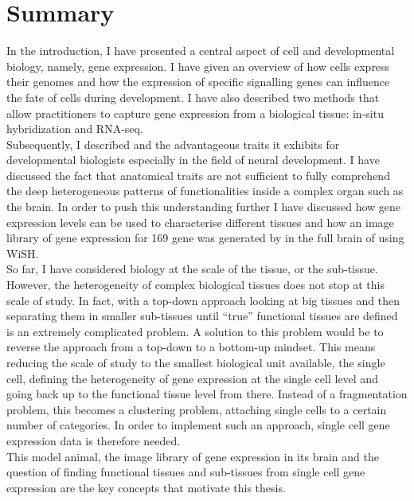     
\section{Summary}
     
     

	In the introduction, I have presented a central aspect of cell and developmental biology, namely, gene expression. I have given an overview of how cells express their genomes and how the expression of specific signalling genes can influence the fate of cells during development. I have also described two methods that allow practitioners to capture gene expression from a biological tissue: in-situ hybridization and RNA-seq.\\
	
	Subsequently, I described \platyfull{} and the advantageous traits it exhibits for developmental biologists especially in the field of neural development. I have discussed the fact that anatomical traits are not sufficient to fully comprehend the deep heterogeneous patterns of functionalities inside a complex organ such as the brain. In order to push this understanding further I have discussed how gene expression levels can be used to characterise different tissues and how an image library of gene expression for 169 gene was generated by \citep{Tomer10} in the full brain of \platy{} using WiSH.\\
	
	So far, I have considered biology at the scale of the tissue, or the sub-tissue. However, the heterogeneity of complex biological tissues does not stop at this scale of study. In fact, with a top-down approach looking at big tissues and then separating them in smaller sub-tissues until ``true'' functional tissues are defined is an extremely complicated problem. A solution to this problem would be to reverse the approach from a top-down to a bottom-up mindset. This means reducing the scale of study to the smallest biological unit available, the single cell, defining the heterogeneity of gene expression at the single cell level and going back up to the functional tissue level from there. Instead of a fragmentation problem, this becomes a clustering problem, attaching single cells to a certain number of categories. In order to implement such an approach, single cell gene expression data is therefore needed.\\
	
	This model animal, the image library of gene expression in its brain and the question of finding functional tissues and sub-tissues from single cell gene expression are the key concepts that motivate this thesis.\\
	
